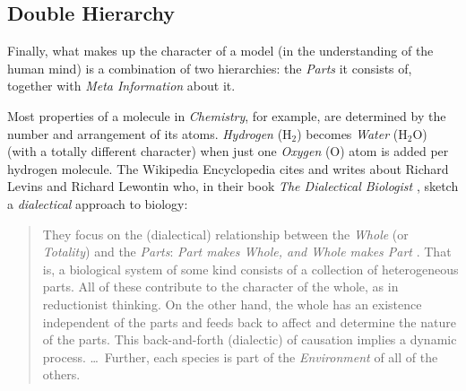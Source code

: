 %
%
%
%
%
%
%

\subsection{Double Hierarchy}
\label{double_hierarchy_heading}

Finally, what makes up the character of a model (in the understanding of the
human mind) is a combination of two hierarchies: the \emph{Parts} it consists
of, together with \emph{Meta Information} about it.

Most properties of a molecule in \emph{Chemistry}, for example, are determined
by the number and arrangement of its atoms. \emph{Hydrogen} (H$_{2}$) becomes
\emph{Water} (H$_{2}$O) (with a totally different character) when just one
\emph{Oxygen} (O) atom is added per hydrogen molecule. The Wikipedia Encyclopedia
\cite{wikipedia} cites and writes about Richard Levins and Richard Lewontin
who, in their book \textit{The Dialectical Biologist} \cite{levins}, sketch a
\emph{dialectical} approach to biology:

\begin{quote}
    They focus on the (dialectical) relationship between the \emph{Whole} (or
    \emph{Totality}) and the \emph{Parts}: \textit{Part makes Whole, and Whole
    makes Part} \cite[p. 272]{levins}. That is, a biological system of some kind
    consists of a collection of heterogeneous parts. All of these contribute to
    the character of the whole, as in reductionist thinking. On the other hand,
    the whole has an existence independent of the parts and feeds back to affect
    and determine the nature of the parts. This back-and-forth (dialectic) of
    causation implies a dynamic process. \ldots\ Further, each species is part
    of the \emph{Environment} of all of the others.
\end{quote}

